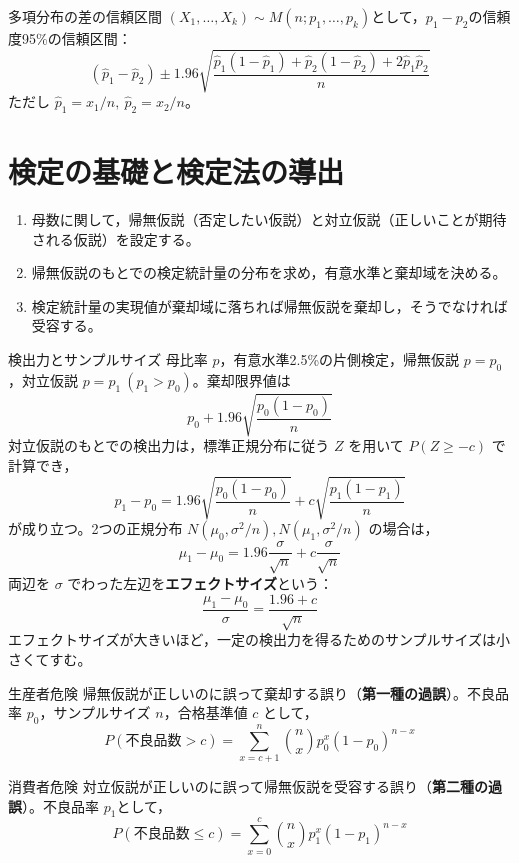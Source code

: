 \documentclass[a4paper,11pt]{ltjsarticle}
\begin{document}
\begin{term}{多項分布の差の信頼区間}
$(X_1,\dots,X_k)\sim M(n;p_1,\dots,p_k)$として，$p_1-p_2$の信頼度95\%の信頼区間：
\[
(\hat p_1-\hat p_2) \pm 1.96\sqrt{\frac{\hat p_1(1-\hat p_1)+\hat p_2(1-\hat p_2)+2\hat p_1\hat p_2}{n}}
\]
ただし $\hat p_1=x_1/n,\ \hat p_2=x_2/n$。
\end{term}

\section{検定の基礎と検定法の導出}

\begin{enumerate}[label=\arabic*.]
\item 母数に関して，帰無仮説（否定したい仮説）と対立仮説（正しいことが期待される仮説）を設定する。
\item 帰無仮説のもとでの検定統計量の分布を求め，有意水準と棄却域を決める。
\item 検定統計量の実現値が棄却域に落ちれば帰無仮説を棄却し，そうでなければ受容する。
\end{enumerate}

\begin{term}{検出力とサンプルサイズ}
母比率 $p$，有意水準2.5\%の片側検定，帰無仮説 $p=p_0$，対立仮説 $p=p_1\ (p_1>p_0)$。棄却限界値は
\[
p_0 + 1.96\sqrt{\frac{p_0(1-p_0)}{n}}
\]
対立仮説のもとでの検出力は，標準正規分布に従う $Z$ を用いて $P(Z\ge -c)$ で計算でき，
\[
p_1-p_0 = 1.96\sqrt{\frac{p_0(1-p_0)}{n}} + c\sqrt{\frac{p_1(1-p_1)}{n}}
\]
が成り立つ。2つの正規分布 $N(\mu_0,\sigma^2/n),N(\mu_1,\sigma^2/n)$ の場合は，
\[
\mu_1-\mu_0 = 1.96\frac{\sigma}{\sqrt n} + c\frac{\sigma}{\sqrt n}
\]
両辺を $\sigma$ でわった左辺を\textbf{エフェクトサイズ}という：
\[
\frac{\mu_1-\mu_0}{\sigma} = \frac{1.96+c}{\sqrt n}
\]
エフェクトサイズが大きいほど，一定の検出力を得るためのサンプルサイズは小さくてすむ。
\end{term}

\begin{term}{生産者危険}
帰無仮説が正しいのに誤って棄却する誤り（\textbf{第一種の過誤}）。不良品率 $p_0$，サンプルサイズ $n$，合格基準値 $c$ として，
\[
P(\text{不良品数}>c) = \sum_{x=c+1}^{n}\binom{n}{x}p_0^x(1-p_0)^{n-x}
\]
\end{term}

\begin{term}{消費者危険}
対立仮説が正しいのに誤って帰無仮説を受容する誤り（\textbf{第二種の過誤}）。不良品率 $p_1$として，
\[
P(\text{不良品数}\le c) = \sum_{x=0}^{c}\binom{n}{x}p_1^x(1-p_1)^{n-x}
\]
\end{term}
\end{document}
